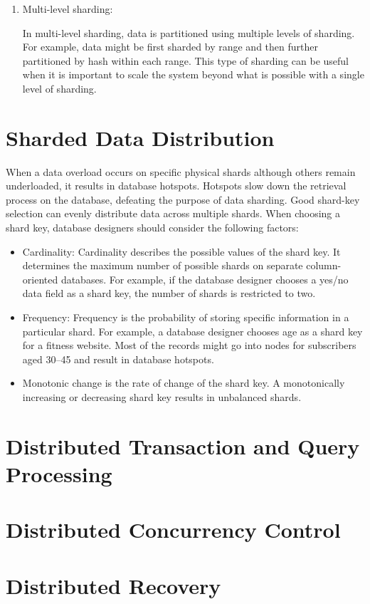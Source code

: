 \begin{enumerate}
\item Multi-level sharding:

In multi-level sharding, data is partitioned using multiple levels of sharding. For example, data might be first sharded by range and then further partitioned by hash within each range. This type of sharding can be useful when it is important to scale the system beyond what is possible with a single level of sharding.
\end{enumerate}

\section{Sharded Data Distribution}

When a data overload occurs on specific physical shards although others remain underloaded, it results in database hotspots. Hotspots slow down the retrieval process on the database, defeating the purpose of data sharding. 
Good shard-key selection can evenly distribute data across multiple shards. When choosing a shard key, database designers should consider the following factors:
\begin{itemize}
\item Cardinality: Cardinality describes the possible values of the shard key. It determines the maximum number of possible shards on separate column-oriented databases. For example, if the database designer chooses a yes/no data field as a shard key, the number of shards is restricted to two.
\item Frequency: Frequency is the probability of storing specific information in a particular shard. For example, a database designer chooses age as a shard key for a fitness website. Most of the records might go into nodes for subscribers aged 30–45 and result in database hotspots.
\item Monotonic change is the rate of change of the shard key. A monotonically increasing or decreasing shard key results in unbalanced shards.
\end{itemize}

\section{Distributed Transaction and Query Processing}
\section{Distributed Concurrency Control}
\section{Distributed Recovery}

